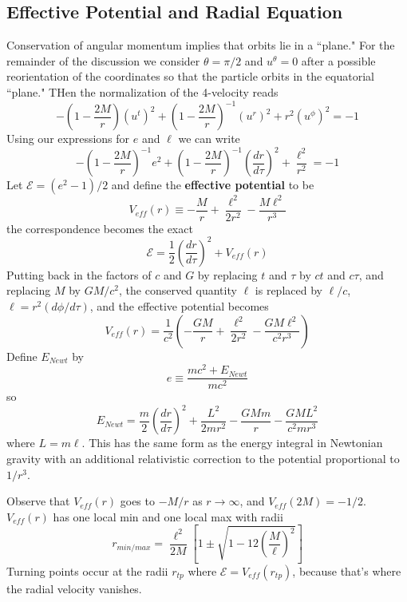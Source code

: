\subsection{Effective Potential and Radial Equation}

Conservation of angular momentum implies that orbits lie in a ``plane." For the remainder of the discussion we consider $\theta = \pi/2$ and $u^{\theta} = 0$ after a possible reorientation of the coordinates so that the particle orbits in the equatorial ``plane." THen the normalization of the 4-velocity reads \begin{equation*}
     -\left(1-\frac{2M}{r}\right)(u^t)^2 + \left(1-\frac{2M}{r}\right)^{-1}(u^r)^2+r^2(u^{\phi})^2 = -1
\end{equation*}
Using our expressions for $e$ and $\ell$ we can write $$-\left(1-\frac{2M}{r}\right)^{-1}e^2+\left(1-\frac{2M}{r}\right)^{-1}\left(\frac{dr}{d\tau}\right)^2+\frac{\ell^2}{r^2}=-1$$
Let $\mathcal{E} = (e^2-1)/2$ and define the \textbf{effective potential} to be \begin{equation*}
    V_{eff}(r) \equiv -\frac{M}{r} + \frac{\ell^2}{2r^2}-\frac{M\ell^2}{r^3}
\end{equation*}
the correspondence becomes the exact $$\boxed{\mathcal{E} = \frac{1}{2}\left(\frac{dr}{d\tau}\right)^2+V_{eff}(r)}$$
Putting back in the factors of $c$ and $G$ by replacing $t$ and $\tau$ by $ct$ and $c\tau$, and replacing $M$ by $GM/c^2$, the conserved quantity $\ell$ is replaced by $\ell/c$, $\ell = r^2(d\phi/d\tau)$, and the effective potential becomes $$V_{eff}(r) = \frac{1}{c^2}\left(-\frac{GM}{r} + \frac{\ell^2}{2r^2}-\frac{GM\ell^2}{c^2r^3}\right)$$
Define $E_{Newt}$ by $$e \equiv \frac{mc^2+E_{Newt}}{mc^2}$$
so $$E_{Newt} = \frac{m}{2}\left(\frac{dr}{d\tau}\right)^2+\frac{L^2}{2mr^2}-\frac{GMm}{r}-\frac{GML^2}{c^2mr^3}$$
where $L = m\ell$. This has the same form as the energy integral in Newtonian gravity with an additional relativistic correction to the potential proportional to $1/r^3$.

Observe that $V_{eff}(r)$ goes to $-M/r$ as $r\rightarrow \infty$, and $V_{eff}(2M) =  -1/2$. $V_{eff}(r)$ has one local min and one local max with radii \begin{equation*}
    r_{min/max} = \frac{\ell^2}{2M}\left[1\pm\sqrt{1-12\left(\frac{M}{\ell}\right)^2}\right]
\end{equation*}
Turning points occur at the radii $r_{tp}$ where $\mathcal{E} = V_{eff}(r_{tp})$, because that's where the radial velocity vanishes.


